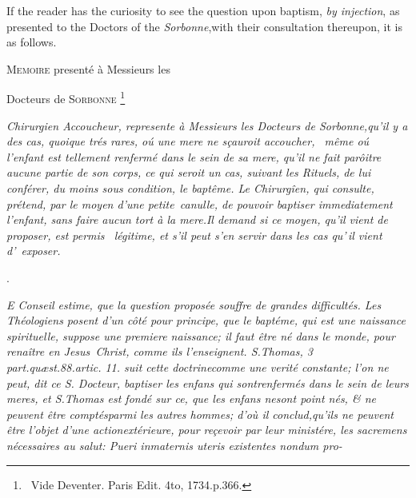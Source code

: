 \documentclass{article}
\begin{document}
\bigskip

\bgroup\fontsize{8}{11}\selectfont
If the reader has
the curiosity to see the question upon baptism, \textit{by injection}, as presented
to the Doctors of the \textit{Sorbonne},\tsk with their consultation thereupon, it is as
follows.\par\egroup\eject

\centerline{\textsc{Memoire} presenté à Messieurs les}
\centerline{Docteurs de \textsc{Sorbonne} \footnote{\ Vide Deventer. Paris Edit. 4to,
1734.\@ p.\@ 366.}}

\bgroup\itshape\small\setlength{\baselineskip}{13pt}
Chirurgien Accoucheur, represente à\break 
Messieurs les Docteurs de
\hbox{\upshape Sorbonne},\break qu’il y a des cas, quoique
trés rares, oú une mere ne sçauroit accoucher, \et\
même oú l’enfant est tellement renfermé
dans le sein de sa mere, qu’il ne fait parôitre aucune
partie de son corps, ce qui seroit un cas, suivant les Rituels, de
lui conférer, du moins sous condition, le baptême. Le
Chirurgîen, qui consulte, prétend, par le moyen
d’une \hbox{\upshape petite canulle,} de pouvoir baptiser
immediatement l’enfant, sans faire aucun tort à la
mere.\tsh  Il demand si ce moyen, qu’il vient de
proposer, est permis \et\ légitime, et s’il peut
s’en servir dans les cas qu’\,il vient
d’~exposer.\egroup

\bigskip{}
\newpage
\centerline{.}

\bgroup\fontsize{9}{13}\selectfont\itshape
E Conseil estime, que la question proposée souffre de
grandes difficultés. Les Théo\-logiens posent d’un côté pour
principe, que\break
le baptéme, qui est une naissance spirituelle,\break
suppose une premiere naissance; il faut être né\break
dans le monde, pour renaître en \hbox{\upshape Jesus Christ},\break
comme ils l’enseignent. S.\@ {\upshape Thomas, 3 part.\break quæst.\@ 88.\@ artic.\@
11.\@} suit cette doctrine\break comme une verité constante; l’on ne peut, dit ce S.
Docteur, baptiser les enfans qui sont\break renfermés dans le sein de leurs meres,
et S.\break \hbox{\upshape Thomas} est fondé sur ce, que les enfans ne\break sont
point nés, \& ne peuvent être comptés\break parmi les autres hommes; d’où il
conclud,\break qu’ils ne peuvent être l’objet d’une action\break extérieure, pour
reçevoir par leur ministére, les sacremens nécessaires au salut: 
\fontsize{9}{13}\selectfont\upshape
Pueri
in\break maternis uteris existentes nondum pro-\break
{}
\egroup
\end{document}
